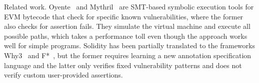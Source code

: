 \begin{paragraph}{Related work.}
Oyente~\cite{Luu2016} and Mythril~\cite{Mythril} are SMT-based symbolic
execution tools for EVM bytecode that check for specific known vulnerabilities,
where the former also checks for assertion fails. They simulate the virtual
machine and execute all possible paths, which takes a performance toll even
though the approach works well for simple programs.
%
Solidity has been partially translated to the frameworks Why3~\cite{Why3} and
F*~\cite{Bhargavan2016}, but the former requires learning a new annotation
specification language and the latter only verifies fixed vulnerability
patterns and does not verify custom user-provided assertions.

\end{paragraph}

